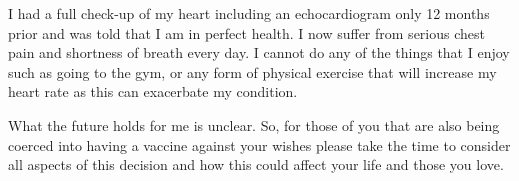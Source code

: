 {I had a full check-up of my heart including an echocardiogram only 12 months
prior and was told that I am in perfect health. I now suffer from serious chest
pain and shortness of breath every day. I cannot do any of the things that I
enjoy such as going to the gym, or any form of physical exercise that will
increase my heart rate as this can exacerbate my condition.

What the future holds for me is unclear. So, for those of you that are also
being coerced into having a vaccine against your wishes please take the time to
consider all aspects of this decision and how this could affect your life and
those you love.

}
